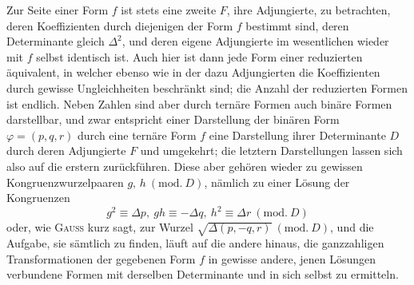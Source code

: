 Zur Seite einer Form \(f\) ist stets eine zweite \(F\), ihre Adjungierte, zu betrachten, deren Koeffizienten durch diejenigen der Form \(f\) bestimmt sind, deren Determinante gleich \(\Delta^2\), und deren eigene Adjungierte im wesentlichen wieder mit \(f\) selbst identisch ist. Auch hier ist dann jede Form einer reduzierten äquivalent, in welcher ebenso wie in der dazu Adjungierten die Koeffizienten durch gewisse Ungleichheiten beschränkt sind; die Anzahl der reduzierten Formen ist endlich. Neben Zahlen sind aber durch ternäre Formen auch binäre Formen darstellbar, und zwar entspricht einer Darstellung der binären Form \(\varphi=(p,q,r)\) durch eine ternäre Form \(f\) eine Darstellung ihrer Determinante \(D\) durch deren Adjungierte \(F\) und umgekehrt; die letztern Darstellungen lassen sich also auf die erstern zurückführen. Diese aber gehören wieder zu gewissen Kongruenzwurzelpaaren \(g,\,h\ (\mathrm{mod.}\ D)\), nämlich zu einer Lösung der Kongruenzen
\[
g^2\equiv\Delta p,\ gh\equiv-\Delta q,\ h^2\equiv\Delta r\ (\mathrm{mod.}\ D)
\]
oder, wie \textsc{Gauss} kurz sagt, zur Wurzel \(\sqrt{\Delta(p,-q,r)}\ (\mathrm{mod.}\ D)\), und die Aufgabe, sie sämtlich zu finden, läuft auf die andere hinaus, die ganzzahligen Transformationen der gegebenen Form \(f\) in gewisse andere, jenen Lösungen verbundene Formen mit derselben Determinante und in sich selbst zu ermitteln.

